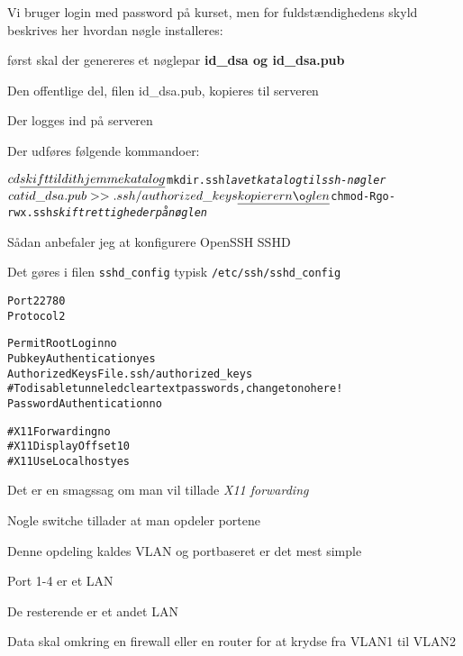 \begin{list1}
\item Vi bruger login med password på kurset, men for
  fuldstændighedens skyld beskrives her hvordan nøgle installeres:

\begin{list2}
\item først skal der genereres et nøglepar {\bfseries id\_dsa og id\_dsa.pub}
\item Den offentlige del, filen id\_dsa.pub, kopieres til serveren
\item Der logges ind på serveren 
\item Der udføres følgende kommandoer:
\end{list2}
\end{list1}
\begin{alltt}
$ cd  \emph{skift til dit hjemmekatalog}
$ mkdir .ssh  \emph{lav et katalog til ssh-nøgler}
$ cat id\_dsa.pub >> .ssh/authorized\_keys  \emph{kopierer nøglen}
$ chmod -R go-rwx .ssh  \emph{skift rettigheder på nøglen}
\end{alltt}



\begin{list1}
\item Sådan anbefaler jeg at konfigurere OpenSSH SSHD
\item Det gøres i filen \verb+sshd_config+ typisk \verb+/etc/ssh/sshd_config+  
\end{list1}

\begin{alltt}
\small
Port 22780
Protocol 2

PermitRootLogin no
PubkeyAuthentication yes
AuthorizedKeysFile      .ssh/authorized_keys
# To disable tunneled clear text passwords, change to no here!
PasswordAuthentication no

#X11Forwarding no
#X11DisplayOffset 10
#X11UseLocalhost yes
\end{alltt}

Det er en smagssag om man vil tillade \emph{X11 forwarding}





\begin{list1}
\item Nogle switche tillader at man opdeler portene
\item Denne opdeling kaldes VLAN og portbaseret er det mest simple
\item Port 1-4 er et LAN
\item De resterende er et andet LAN
\item Data skal omkring en firewall eller en router for at krydse fra VLAN1 til VLAN2
\end{list1}

